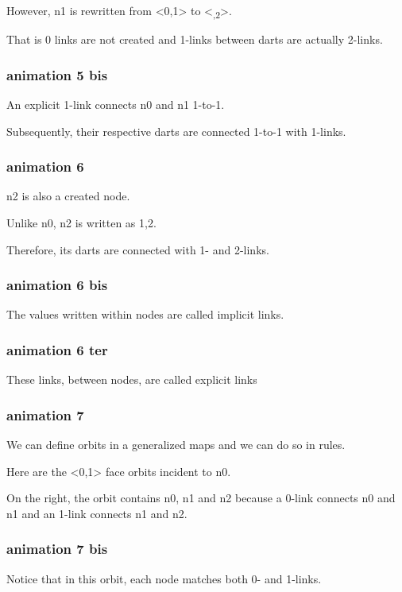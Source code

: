 \documentclass[11pt]{article}
\begin{document}
However, n1 is rewritten from <0,1> to <\textsubscript{,2}>.

That is 0 links are not created and 1-links between darts are actually 2-links.

\subsubsection{animation 5 bis}
\label{sec:orgb1c2f07}
An explicit 1-link connects n0 and n1 1-to-1.

Subsequently, their respective darts are connected 1-to-1 with 1-links.

\subsubsection{animation 6}
\label{sec:org576f067}
n2 is also a created node.

Unlike n0, n2 is written as 1,2.

Therefore, its darts are connected with 1- and 2-links.

\subsubsection{animation 6 bis}
\label{sec:orgc08b16d}
The values written within nodes are called implicit links.

\subsubsection{animation 6 ter}
\label{sec:org8052f6b}
These links, between nodes, are called explicit links

\subsubsection{animation 7}
\label{sec:orga904058}
We can define orbits in a generalized maps and we can do so in rules.

Here are the <0,1> face orbits incident to n0.

On the right, the orbit contains n0, n1 and n2 because a 0-link connects n0 and
n1 and an 1-link connects n1 and n2.

\subsubsection{animation 7 bis}
\label{sec:org914f7fe}
Notice that in this orbit, each node matches both 0- and 1-links.
\end{document}
